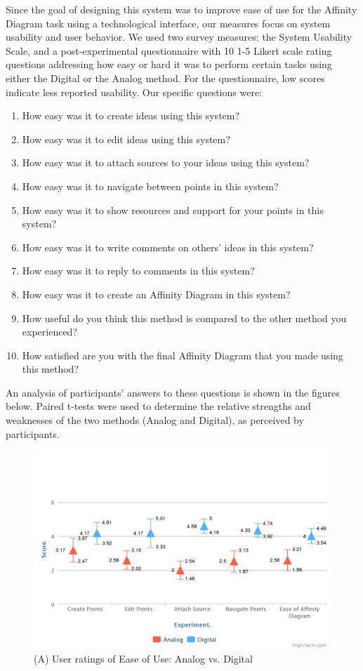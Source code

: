\documentclass{sigchi}
\begin{document}
Since the goal of designing this system was to improve ease of use for the Affinity Diagram task using a technological interface, our measures focus on system usability and user behavior. We used two survey measures: the System Usability Scale\cite{brooke1996sus}, and a post-experimental questionnaire with 10 1-5 Likert scale rating questions addressing how easy or hard it was to perform certain tasks using either the Digital or the Analog method. For the questionnaire, low scores indicate less reported usability. Our specific questions were:

\begin{enumerate}
  \item How easy was it to create ideas using this system?
  \item How easy was it to edit ideas using this system?
  \item How easy was it to attach sources to your ideas using this system? 
  \item How easy was it to navigate between points in this system?
  \item How easy was it to show resources and support for your points in this system?
  \item How easy was it to write comments on others' ideas in this system?
  \item How easy was it to reply to comments in this system? 
  \item How easy was it to create an Affinity Diagram in this system?
  \item How useful do you think this method is compared to the other method you experienced?  
  \item How satisfied are you with the final Affinity Diagram that you made using this method?  
\end{enumerate}

An analysis of participants' answers to these questions is shown in the figures below. Paired t-tests were used to determine the relative strengths and weaknesses of the two methods (Analog and Digital), as perceived by participants.


\begin{figure}[!h]
\centering
\includegraphics[width=1.0\columnwidth]{basicchart}
\caption{(A) User ratings of Ease of Use: Analog vs. Digital}
\label{fig:figure1}
\end{figure}
\end{document}
